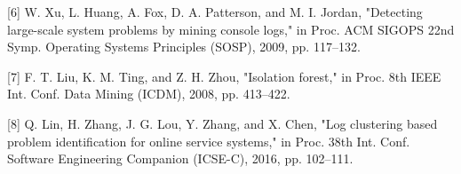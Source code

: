 \documentclass[
  11pt,
]{article}
\begin{document}
{[}6{]} W. Xu, L. Huang, A. Fox, D. A. Patterson, and M. I. Jordan,
"Detecting large-scale system problems by mining console logs," in Proc.
ACM SIGOPS 22nd Symp. Operating Systems Principles (SOSP), 2009, pp.
117--132.

{[}7{]} F. T. Liu, K. M. Ting, and Z. H. Zhou, "Isolation forest," in
Proc. 8th IEEE Int. Conf. Data Mining (ICDM), 2008, pp. 413--422.

{[}8{]} Q. Lin, H. Zhang, J. G. Lou, Y. Zhang, and X. Chen, "Log
clustering based problem identification for online service systems," in
Proc. 38th Int. Conf. Software Engineering Companion (ICSE-C), 2016, pp.
102--111.
\end{document}
